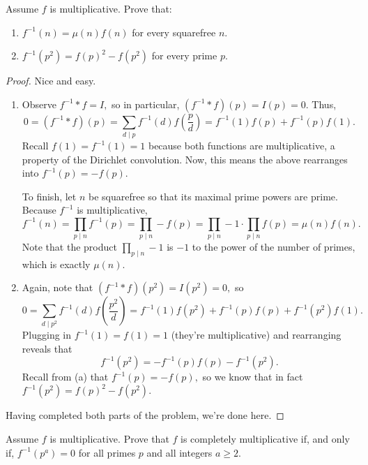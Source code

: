 \begin{exercise}
Assume $f$ is multiplicative. Prove that:
\begin{enumerate}[label=(\alph*)]
    \item $f^{-1}(n)=\mu(n)f(n)$ for every squarefree $n.$
    \item $f^{-1}\left(p^2\right)=f(p)^2-f\left(p^2\right)$ for every prime $p.$
\end{enumerate}
\end{exercise}

\begin{proof}
Nice and easy.
\begin{enumerate}[label=(\alph*)]
    \item Observe $f^{-1}*f=I,$ so in particular, $\left(f^{-1}*f\right)(p)=I(p)=0.$ Thus,
    \[0=\left(f^{-1}*f\right)(p)=\sum_{d\mid p}f^{-1}(d)f\left(\frac pd\right)=f^{-1}(1)f(p)+f^{-1}(p)f(1).\]
    Recall $f(1)=f^{-1}(1)=1$ because both functions are multiplicative, a property of the Dirichlet convolution. Now, this means the above rearranges into $f^{-1}(p)=-f(p).$
    
    To finish, let $n$ be squarefree so that its maximal prime powers are prime. Because $f^{-1}$ is multiplicative,
    \[f^{-1}(n)=\prod_{p\mid n}f^{-1}(p)=\prod_{p\mid n}-f(p)=\prod_{p\mid n}-1\cdot\prod_{p\mid n}f(p)=\mu(n)f(n).\]
    Note that the product $\prod_{p\mid n}-1$ is $-1$ to the power of the number of primes, which is exactly $\mu(n).$
    \item Again, note that $\left(f^{-1}*f\right)\left(p^2\right)=I\left(p^2\right)=0,$ so
    \[0=\sum_{d\mid p^2}f^{-1}(d)f\left(\frac{p^2}d\right)=f^{-1}(1)f\left(p^2\right)+f^{-1}(p)f(p)+f^{-1}\left(p^2\right)f(1).\]
    Plugging in $f^{-1}(1)=f(1)=1$ (they're multiplicative) and rearranging reveals that
    \[f^{-1}\left(p^2\right)=-f^{-1}(p)f(p)-f^{-1}\left(p^2\right).\]
    Recall from (a) that $f^{-1}(p)=-f(p),$ so we know that in fact $f^{-1}\left(p^2\right)=f(p)^2-f\left(p^2\right).$
\end{enumerate}
Having completed both parts of the problem, we're done here.
\end{proof}

\begin{exercise}
Assume $f$ is multiplicative. Prove that $f$ is completely multiplicative if, and only if, $f^{-1}\left(p^a\right)=0$ for all primes $p$ and all integers $a\ge2.$
\end{exercise}

